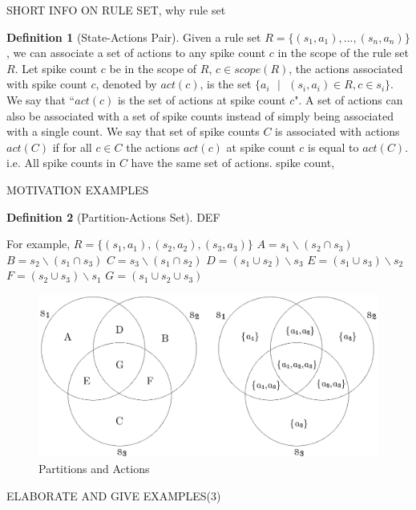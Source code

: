 \documentclass[]{elsarticle}
\theoremstyle{definition}
\newtheorem{definition2}{Definition}
\theoremstyle{definition}
\newcommand{\se}{\text{ }}
\begin{document}
SHORT INFO ON RULE SET, why rule set

\begin{definition2}[State-Actions Pair]
Given a rule set $R=\{(s_1,a_1),...,(s_n,a_n)\}$, we can associate a set of actions to any spike 
count $c$ in the scope of the rule set $R$. Let spike count $c$ be in the scope of $R$, $c\in 
scope(R)$, the actions associated with spike count $c$, denoted by $act(c)$, is the set 
$\{a_i\se |\se (s_i,a_i) \in R, c\in s_i\}$. We say that ``$act(c)$ is the set of actions at spike
count $c$". A set of actions can also be associated with a set of spike counts instead of simply
being associated with a single count. We say that set of spike counts $C$ is associated with actions
$act(C)$ if for all $c \in C$ the actions $act(c)$ at spike count $c$ is equal to $act(C)$. i.e. All
spike counts in $C$ have the same set of actions.
spike count,
\end{definition2}

MOTIVATION EXAMPLES

\begin{definition2}[Partition-Actions Set]
DEF
\end{definition2}


For example, $R = \{(s_1,a_1),(s_2,a_2),(s_3,a_3)\}$
$A = s_1\backslash (s_2 \cap s_3)$ 
$B = s_2\backslash (s_1 \cap s_3)$ 
$C = s_3\backslash (s_1 \cap s_2)$ 
$D = (s_1 \cup s_2 ) \backslash s_3$ 
$E = (s_1 \cup s_3 ) \backslash s_2$ 
$F = (s_2 \cup s_3 ) \backslash s_1$ 
$G = (s_1 \cup s_2 \cup s_3 )$ 

\begin{figure}[H]
    \centering
    \includegraphics[scale=0.35]{fig-partitions-1.pdf}
    \caption{Partitions and Actions}
    \label{fig-partition-1}
\end{figure}

ELABORATE AND GIVE EXAMPLES(3)
\end{document}
